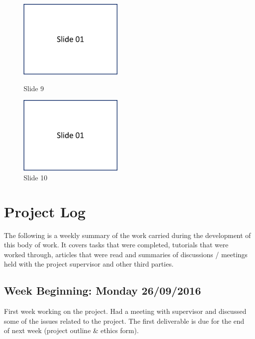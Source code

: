 \begin{figure}[H]
\parbox{74.mm}{
    \centering
    \includegraphics[width=0.45\textwidth,page=9]{appendix/images/PresentationSlides}
    \caption*{Slide 9}
}
    \parbox{74.mm}{
    \centering
    \includegraphics[width=0.45\textwidth,page=10]{appendix/images/PresentationSlides}
    \caption*{Slide 10}
}
\end{figure}

\chapter{Project Log}

The following is a weekly summary of the work carried during the development of this body of work. It covers tasks that were completed, tutorials that were worked through, articles that were read and summaries of discussions / meetings held with the project supervisor and other third parties. 

\section*{Week Beginning: Monday 26/09/2016}

First week working on the project. Had a meeting with supervisor and discussed some of the issues related to the project. The first deliverable is due for the end of next week (project outline \& ethics form). 

